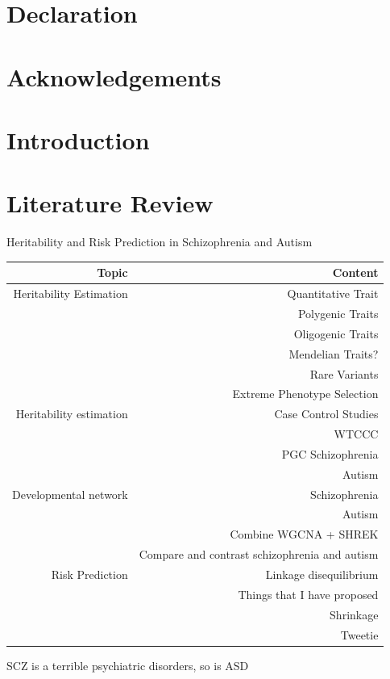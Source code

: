 \documentclass{book}
\begin{document}
	\chapter*{Declaration}
	
	\cleardoublepage
	\chapter*{Acknowledgements}
	\cleardoublepage
	
	\printglossary[title=Abbreviations,toctitle=Abbreviations]
	\cleardoublepage
	
	\cleardoublepage
	\begin{singlespace}
		\tableofcontents
	\end{singlespace}
\mainmatter
\chapter*{Introduction}\pagestyle{fancy}
\chapter{Literature Review}
Heritability and Risk Prediction in Schizophrenia and Autism
\begin{table}[h]
	\begin{tabular}{|r|r|}
		\hline
		\textbf{Topic} & \textbf{Content} \\
		\hline
		Heritability Estimation & Quantitative Trait \\
		& Polygenic Traits\\
		& Oligogenic Traits\\
		& Mendelian Traits?\\
		& Rare Variants \\
		& Extreme Phenotype Selection \\
		\hline
		Heritability estimation & Case Control Studies \\
		& WTCCC \\
		& PGC Schizophrenia \\
		& Autism \\
		\hline
		Developmental network & Schizophrenia \\
		& Autism \\
		& Combine WGCNA + SHREK \\
		& Compare and contrast schizophrenia and autism\\
		\hline
		Risk Prediction & Linkage disequilibrium \\
		& Things that I have proposed \\
		& Shrinkage \\
		& Tweetie \\
		\hline
	\end{tabular}
\end{table}
\acrfull{SCZ} is a terrible psychiatric disorders, so is \acrfull{ASD}
\end{document}
